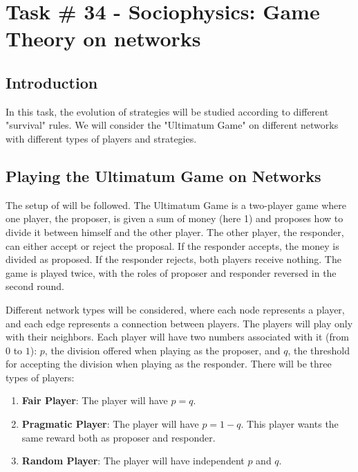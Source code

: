 \chapter{Task \# 34 - Sociophysics: Game Theory on networks}


\section{Introduction}
 
In this task, the evolution of strategies will be studied according to different "survival" rules. We will consider the "Ultimatum Game" on different networks with different types of players and strategies.

\section{Playing the Ultimatum Game on Networks}


The setup of \cite{UltimatumGame} will be followed. The Ultimatum Game is a two-player game where one player, the proposer, is given a sum of money (here 1) and proposes how to divide it between himself and the other player. The other player, the responder, can either accept or reject the proposal. If the responder accepts, the money is divided as proposed. If the responder rejects, both players receive nothing. The game is played twice, with the roles of proposer and responder reversed in the second round.


Different network types will be considered, where each node represents a player, and each edge represents a connection between players. The players will play only with their neighbors. Each player will have two numbers associated with it (from $0$ to $1$): $p$, the division offered when playing as the proposer, and $q$, the threshold for accepting the division when playing as the responder.
There will be three types of players:
\begin{enumerate}[label=(\Alph*)]
    \item \textbf{Fair Player}: The player will have $p = q$.
    \item \textbf{Pragmatic Player}: The player will have $p = 1 - q$. This player wants the same reward both as proposer and responder.
    \item \textbf{Random Player}: The player will have independent $p$ and $q$.
\end{enumerate}

